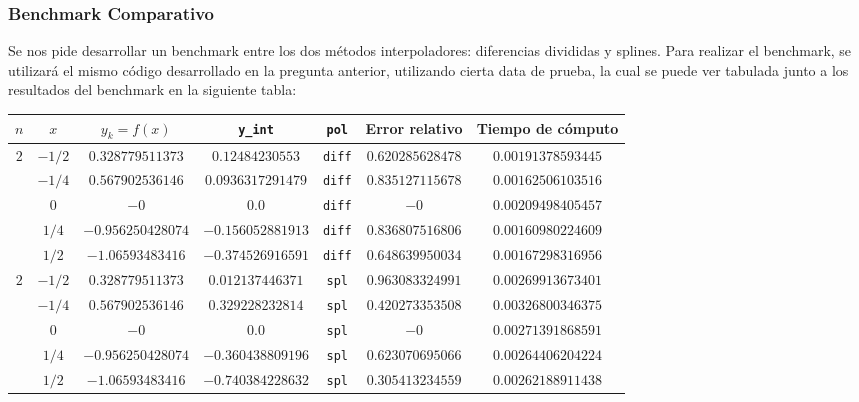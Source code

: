 \documentclass[12pt,letterpaper]{article}
\begin{document}
\subsubsection{Benchmark Comparativo}
Se nos pide desarrollar un benchmark entre los dos métodos interpoladores: diferencias divididas y splines. Para realizar el benchmark, se utilizará el mismo código desarrollado en la pregunta anterior, utilizando cierta data de prueba, la cual se puede ver tabulada junto a los resultados del benchmark en la siguiente tabla:
\begin{table}
\begin{center}
	\begin{tabular}{|c|c|c|c|c|c|c|}
		\hline
		$n$ & $x$ & $y_k = f(x)$ & \verb+y_int+ & \verb+pol+ & \textbf{Error relativo} & \textbf{Tiempo de cómputo} \\
		\hline \hline
			
		\multirow{5}{*}{$2$}
			& $-1/2$ & $0.328779511373$ & $0.12484230553$ & \verb+diff+ & $0.620285628478$ & $0.00191378593445$ \\
			& $-1/4$ & $0.567902536146$ & $0.0936317291479$ & \verb+diff+ & $0.835127115678$ & $0.00162506103516$ \\
			& $0$ & $-0$ & $0.0$ & \verb+diff+ & $-0$ & $0.00209498405457$ \\
			& $1/4$ & $-0.956250428074$ & $-0.156052881913$ & \verb+diff+ & $0.836807516806$ & $0.00160980224609$ \\
			& $1/2$ & $-1.06593483416$ & $-0.374526916591$ & \verb+diff+ & $0.648639950034$ & $0.00167298316956$ \\
		\hline
		\multirow{5}{*}{$2$}
			& $-1/2$ & $0.328779511373$ & $0.012137446371$ & \verb+spl+ & $0.963083324991$ & $0.00269913673401$ \\
			& $-1/4$ & $0.567902536146$ & $0.329228232814$ & \verb+spl+ & $0.420273353508$ & $0.00326800346375$ \\
			& $0$ & $-0$ & $0.0$ & \verb+spl+ & $-0$ & $0.00271391868591$ \\
			& $1/4$ & $-0.956250428074$ & $-0.360438809196$ & \verb+spl+ & $0.623070695066$ & $0.00264406204224$ \\
			& $1/2$ & $-1.06593483416$ & $-0.740384228632$ & \verb+spl+ & $0.305413234559$ & $0.00262188911438$ \\
		\hline \hline
		

\end{tabular}
\end{center}
\end{table}
\end{document}
